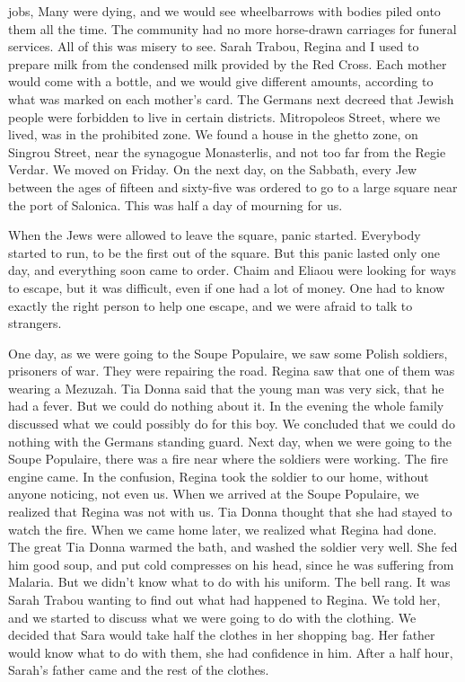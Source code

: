 jobs, Many were dying, and we would see wheelbarrows with bodies piled 
onto them all the time. The community had no more horse-drawn 
carriages for funeral services. All of this was misery to see. 
Sarah Trabou, Regina and I used to prepare milk from the condensed 
milk provided by the Red Cross. Each mother would come with a bottle, 
and we would give different amounts, according to what was marked on 
each mother's card. 
The Germans next decreed that Jewish people were forbidden to live 
in certain districts. Mitropoleos Street, where we lived, was 
in the prohibited zone. We found a house in the ghetto zone, on Singrou 
Street, near the synagogue Monasterlis, and not too far from the Regie 
Verdar. We moved on Friday. On the next day, on the Sabbath, every Jew 
between the ages of fifteen and sixty-five was ordered to go to a large 
square near the port of Salonica. This was half a day of mourning for us. 

When the Jews were allowed to leave the square, panic started. Everybody started to run, to be the first out of the square. But this panic 
lasted only one day, and everything soon came to order. Chaim and Eliaou 
were looking for ways to escape, but it was difficult, even if one had 
a lot of money. One had to know exactly the right person to help one 
escape, and we were afraid to talk to strangers. 

One day, as we were going to the Soupe Populaire, we saw some
Polish soldiers, prisoners of war. They were repairing the road. Regina 
saw that one of them was wearing a Mezuzah. Tia Donna said that the 
young man was very sick, that he had a fever. But we could do nothing 
about it. In the evening the whole family discussed what we could possibly 
do for this boy. We concluded that we could do nothing with the Germans standing guard. Next day, when we were going to the Soupe Populaire,
there was a fire near where the soldiers were working. The fire engine 
came. In the confusion, Regina took the soldier to our home, without 
anyone noticing, not even us. When we arrived at the Soupe Populaire, we 
realized that Regina was not with us. Tia Donna thought that she had 
stayed to watch the fire. 
When we came home later, we realized what Regina had done. The 
great Tia Donna warmed the bath, and washed the soldier very well. She 
fed him good soup, and put cold compresses on his head, since he was 
suffering from Malaria. But we didn't know what to do with his uniform. 
The bell rang. It was Sarah Trabou wanting to find out what had happened 
to Regina. We told her, and we started to discuss what we were going to 
do with the clothing. We decided that Sara would take half the clothes 
in her shopping bag. Her father would know what to do with them, she 
had confidence in him. After a half hour, Sarah's father came and 
the rest of the clothes.

